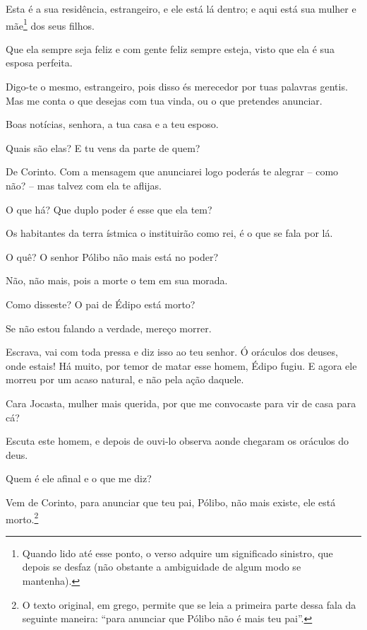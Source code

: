    Esta é a sua residência, estrangeiro, e ele está lá dentro; e aqui está
sua mulher e mãe\footnote{Quando lido até esse ponto, o verso adquire um
  significado sinistro, que depois se desfaz (não obstante a ambiguidade
  de algum modo se mantenha).} dos seus filhos.

   Que ela sempre seja feliz e com gente feliz sempre esteja, visto
que ela é sua esposa perfeita.

   Digo-te o mesmo, estrangeiro, pois disso és merecedor por tuas palavras
gentis. Mas me conta o que desejas com tua vinda, ou o que pretendes
anunciar.

   Boas notícias, senhora, a tua casa e a teu esposo.

   Quais são elas? E tu vens da parte de quem?

   De Corinto. Com a mensagem que anunciarei logo poderás te alegrar --
como não? -- mas talvez com ela te aflijas.

   O que há? Que duplo poder é esse que ela tem?

   Os habitantes da terra ístmica o instituirão como rei, é o que se
fala por lá.

   O quê? O senhor Pólibo não mais está no poder?

   Não, não mais, pois a morte o tem em sua morada.

   Como disseste? O pai de Édipo está morto?

   Se não estou falando a verdade, mereço morrer.

   Escrava, vai com toda pressa e diz isso ao teu senhor. Ó oráculos dos
deuses, onde estais! Há muito, por temor de matar esse homem, Édipo
fugiu. E agora ele morreu por um acaso natural, e não pela ação daquele.


   Cara Jocasta, mulher mais querida, por que me convocaste para vir
de casa para cá?

   Escuta este homem, e depois de ouvi-lo observa aonde chegaram os
oráculos do deus.

   Quem é ele afinal e o que me diz?

   Vem de Corinto, para anunciar que teu pai, Pólibo, não mais existe, ele
está morto.\footnote{O texto original, em grego, permite que se leia a
  primeira parte dessa fala da seguinte maneira: ``para anunciar
  que Pólibo não é mais teu pai''.}

